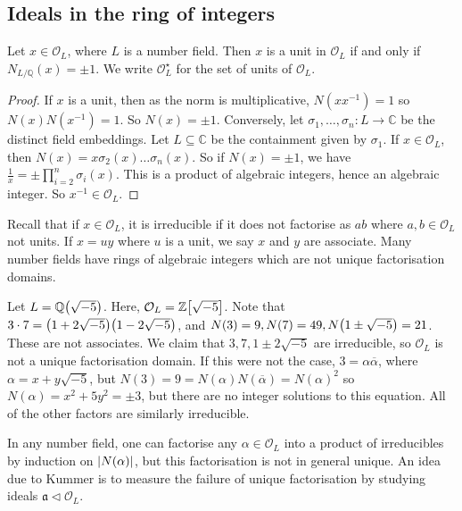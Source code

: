 \subsection{Ideals in the ring of integers}
\begin{lemma}
    Let \( x \in \mathcal O_L \), where \( L \) is a number field.
    Then \( x \) is a unit in \( \mathcal O_L \) if and only if \( N_{L/\mathbb Q}(x) = \pm 1 \).
    We write \( \mathcal O_L^\star \) for the set of units of \( \mathcal O_L \).
\end{lemma}
\begin{proof}
    If \( x \) is a unit, then as the norm is multiplicative, \( N(x x^{-1}) = 1 \) so \( N(x)N(x^{-1}) = 1 \).
    So \( N(x) = \pm 1 \).
    Conversely, let \( \sigma_1, \dots, \sigma_n \colon L \to \mathbb C \) be the distinct field embeddings.
    Let \( L \subseteq \mathbb C \) be the containment given by \( \sigma_1 \).
    If \( x \in \mathcal O_L \), then \( N(x) = x\sigma_2(x) \dots \sigma_n(x) \).
    So if \( N(x) = \pm 1 \), we have \( \frac{1}{x} = \pm \prod_{i=2}^n \sigma_i(x) \).
    This is a product of algebraic integers, hence an algebraic integer.
    So \( x^{-1} \in \mathcal O_L \).
\end{proof}
Recall that if \( x \in \mathcal O_L \), it is irreducible if it does not factorise as \( ab \) where \( a, b \in \mathcal O_L \) not units.
If \( x = uy \) where \( u \) is a unit, we say \( x \) and \( y \) are associate.
Many number fields have rings of algebraic integers which are not unique factorisation domains.
\begin{example}
    Let \( L = \mathbb Q\qty(\sqrt{-5}) \).
    Here, \( \mathcal O_L = \mathbb Z\qty[\sqrt{-5}] \).
    Note that \( 3 \cdot 7 = \qty(1 + 2\sqrt{-5})\qty(1 - 2\sqrt{-5}) \), and \( N(3) = 9, N(7) = 49, N\qty(1 \pm \sqrt{-5}) = 21 \).
    These are not associates.
    We claim that \( 3, 7, 1 \pm 2 \sqrt{-5} \) are irreducible, so \( \mathcal O_L \) is not a unique factorisation domain.
    If this were not the case, \( 3 = \alpha \overline \alpha \), where \( \alpha = x + y\sqrt{-5} \), but \( N(3) = 9 = N(\alpha) N(\overline \alpha) = N(\alpha)^2 \) so \( N(\alpha) = x^2 + 5y^2 = \pm 3 \), but there are no integer solutions to this equation.
    All of the other factors are similarly irreducible.
\end{example}
\begin{remark}
    In any number field, one can factorise any \( \alpha \in \mathcal O_L \) into a product of irreducibles by induction on \( \abs{N(\alpha)} \), but this factorisation is not in general unique.
    An idea due to Kummer is to measure the failure of unique factorisation by studying ideals \( \mathfrak a \triangleleft \mathcal O_L \).
\end{remark}
